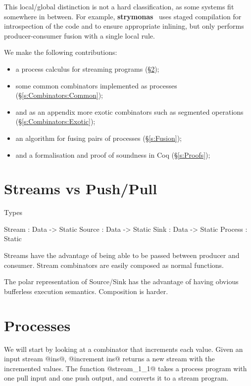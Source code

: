 This local/global distinction is not a hard classification, as some systems fit somewhere in between.
For example, {\bf strymonas}~\cite{kiselyov2016stream} uses staged compilation for introspection of the code and to ensure appropriate inlining, but only performs producer-consumer fusion with a single local rule.




We make the following contributions:
\begin{itemize}
\item a process calculus for streaming programs (\S\ref{s:Process});
\item some common combinators implemented as processes (\S\ref{s:Combinators:Common});
\item and as an appendix more exotic combinators such as segmented operations (\S\ref{s:Combinators:Exotic});
\item an algorithm for fusing pairs of processes (\S\ref{s:Fusion});
\item and a formalisation and proof of soundness in Coq (\S\ref{s:Proofs});
\end{itemize}

\section{Streams vs Push/Pull}

Types
\begin{code}
Stream  : Data -> Static
Source  : Data -> Static
Sink    : Data -> Static
Process :         Static
\end{code}

Streams have the advantage of being able to be passed between producer and consumer.
Stream combinators are easily composed as normal functions.

The polar representation of Source/Sink has the advantage of having obvious bufferless execution semantics.
Composition is harder.



\section{Processes}
\label{s:Process}
We will start by looking at a combinator that increments each value.
Given an input stream @ins@, @increment ins@ returns a new stream with the incremented values.
The function @stream_1_1@ takes a process program with one pull input and one push output, and converts it to a stream program.

